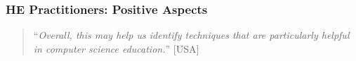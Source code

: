 \documentclass[sigconf]{acmart}
\begin{document}


\subsubsection{HE Practitioners: Positive Aspects}

\begin{quotation}
``{\emph{Overall, this may help us identify techniques that are
particularly helpful in computer science education.}}'' [USA]
\end{quotation}
\end{document}
